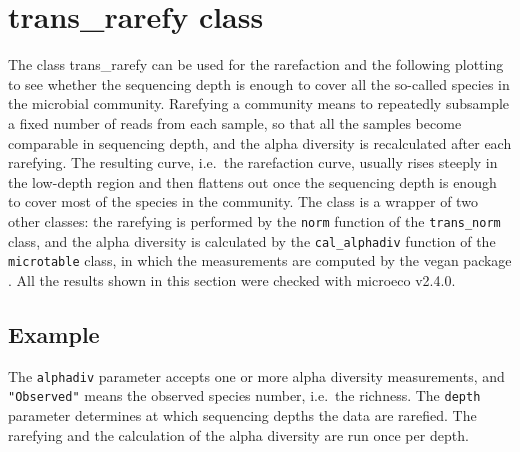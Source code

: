 \documentclass[
]{book}
\begin{document}
\section{trans\_rarefy class}\label{trans_rarefy-class}

The class trans\_rarefy can be used for the rarefaction and the following plotting to see whether
the sequencing depth is enough to cover all the so-called species in the microbial community.
Rarefying a community means to repeatedly subsample a fixed number of reads from each sample, so that
all the samples become comparable in sequencing depth, and the alpha diversity is recalculated after
each rarefying.
The resulting curve, i.e.~the rarefaction curve, usually rises steeply in the low-depth region and then
flattens out once the sequencing depth is enough to cover most of the species in the community.
The class is a wrapper of two other classes: the rarefying is performed by the \texttt{norm} function of the
\texttt{trans\_norm} class, and the alpha diversity is calculated by the \texttt{cal\_alphadiv} function of the
\texttt{microtable} class, in which the measurements are computed by the vegan package \citep{Jari_vegan_2019}.
All the results shown in this section were checked with microeco v2.4.0.

\subsection{Example}\label{example-4}

The \texttt{alphadiv} parameter accepts one or more alpha diversity measurements, and \texttt{"Observed"} means the
observed species number, i.e.~the richness.
The \texttt{depth} parameter determines at which sequencing depths the data are rarefied.
The rarefying and the calculation of the alpha diversity are run once per depth.
\end{document}
